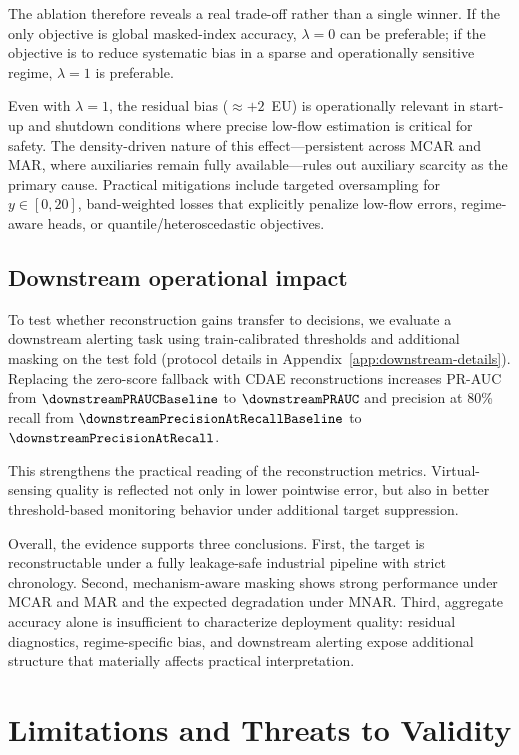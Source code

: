 The ablation therefore reveals a real trade-off rather than a single winner. If the only objective is global masked-index accuracy, $\lambda{=}0$ can be preferable; if the objective is to reduce systematic bias in a sparse and operationally sensitive regime, $\lambda{=}1$ is preferable.

Even with $\lambda{=}1$, the residual bias (${\approx}{+}2$~EU) is operationally relevant in start-up and shutdown conditions where precise low-flow estimation is critical for safety. The density-driven nature of this effect---persistent across MCAR and MAR, where auxiliaries remain fully available---rules out auxiliary scarcity as the primary cause. Practical mitigations include targeted oversampling for $y\!\in\![0,20]$, band-weighted losses that explicitly penalize low-flow errors, regime-aware heads, or quantile/heteroscedastic objectives.


\subsection{Downstream operational impact}
To test whether reconstruction gains transfer to decisions, we evaluate a downstream alerting task using train-calibrated thresholds and additional masking on the test fold (protocol details in Appendix~\ref{app:downstream-details}). Replacing the zero-score fallback with CDAE reconstructions increases PR-AUC from $\downstreamPRAUCBaseline$ to $\downstreamPRAUC$ and precision at 80\% recall from $\downstreamPrecisionAtRecallBaseline$ to $\downstreamPrecisionAtRecall$.

This strengthens the practical reading of the reconstruction metrics. Virtual-sensing quality is reflected not only in lower pointwise error, but also in better threshold-based monitoring behavior under additional target suppression.

Overall, the evidence supports three conclusions. First, the target is reconstructable under a fully leakage-safe industrial pipeline with strict chronology. Second, mechanism-aware masking shows strong performance under MCAR and MAR and the expected degradation under MNAR. Third, aggregate accuracy alone is insufficient to characterize deployment quality: residual diagnostics, regime-specific bias, and downstream alerting expose additional structure that materially affects practical interpretation.


\section{Limitations and Threats to Validity}\label{sec:limitations}

